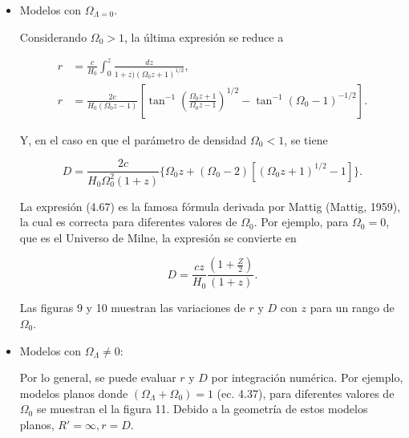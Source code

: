 \documentclass[11pt]{article}
\begin{document}
{    
    \begin{itemize}
	        \item Modelos con $\Omega_{\Lambda=0}$. 

		Considerando $\Omega_0 >1$, la última expresión se reduce a 
		
		\begin{align}
		    r &= \frac{c}{H_0} \int_0^z{\frac{dz}{1+z) (\Omega_0 z + 1)^{1/2}}}, \\
		    r& =  \frac{2c}{H_0 (\Omega_0 z -1)} \left[ \tan^{-1} \left(\frac{\Omega_0 z + 1}{\Omega_0 z -1} \right)^{1/2} - \tan^{-1} (\Omega_0 -1)^{-1/2} \right].
		\end{align}
     
     Y, en el caso en que el parámetro de densidad $\Omega_0 <1$, se tiene
     
     \begin{equation}
         D = \frac{2c}{H_0 \Omega_0^2( 1+z)} \{ \Omega_0 z+ (\Omega_0 - 2) [(\Omega_0 z+1)^{1/2} - 1 ] \}.
     \end{equation}
    
    La expresión (4.67) es la famosa fórmula derivada por Mattig (Mattig, 1959), la cual es correcta para diferentes valores de $\Omega_0$. Por ejemplo, para $\Omega_0 = 0$, que es el Universo de Milne, la expresión se convierte en 
    
    
    \begin{equation}
         D = \frac{cz}{H_0} \frac{\left( 1 + \frac{Z}{2} \right)}{(1+z)}.
    \end{equation}
    
    Las figuras 9 y 10 muestran las variaciones de $r$ y $D$ con $z$ para un rango de $\Omega_0$. 
    
    \item Modelos con $\Omega_{\Lambda} \neq 0$:
    
    Por lo general, se puede evaluar $r$ y $D$ por integración numérica. Por ejemplo, modelos planos donde $(\Omega_{\Lambda} + \Omega_0)=1$ (ec. 4.37), para diferentes valores de $\Omega_0$ se muestran el la figura 11. Debido a la geometría de estos modelos planos, $R'=\infty, r = D$.
    
    
    
    \end{itemize}
    
}
\end{document}
